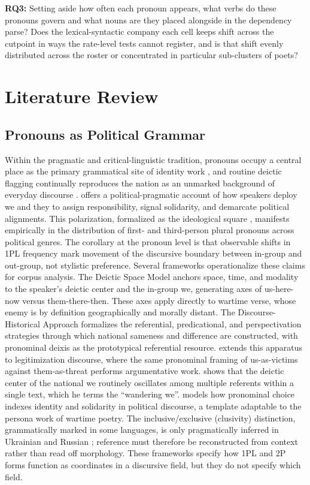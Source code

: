 \documentclass[12pt]{interact}
\theoremstyle{plain}%
\theoremstyle{definition}
\theoremstyle{remark}
\begin{document}
\textbf{RQ3:} Setting aside how often each pronoun appears, what verbs do these pronouns govern and what nouns are they placed alongside in the dependency parse? Does the lexical-syntactic company each cell keeps shift across the cutpoint in ways the rate-level tests cannot register, and is that shift evenly distributed across the roster or concentrated in particular sub-clusters of poets?

\section{Literature Review}

\subsection{Pronouns as Political Grammar}
Within the pragmatic and critical-linguistic tradition, pronouns occupy a central place as the primary grammatical site of identity work \citep{muhlhausler1990pronouns}, and routine deictic flagging continually reproduces the nation as an unmarked background of everyday discourse \citep{billig1995banal}. \citet{wilson1990politically} offers a political-pragmatic account of how speakers deploy we and they to assign responsibility, signal solidarity, and demarcate political alignments. This polarization, formalized as the ideological square \citep{vanDijk2011}, manifests empirically in the distribution of first- and third-person plural pronouns across political genres. The corollary at the pronoun level is that observable shifts in 1PL frequency mark movement of the discursive boundary between in-group and out-group, not stylistic preference.
Several frameworks operationalize these claims for corpus analysis. The Deictic Space Model \citep{chilton2004analysing} anchors space, time, and modality to the speaker's deictic center and the in-group we, generating axes of us-here-now versus them-there-then. These axes apply directly to wartime verse, whose enemy is by definition geographically and morally distant. The Discourse-Historical Approach \citep{wodak2009the} formalizes the referential, predicational, and perspectivation strategies through which national sameness and difference are constructed, with pronominal deixis as the prototypical referential resource. \citet{reyes2011strategies} extends this apparatus to legitimization discourse, where the same pronominal framing of us-as-victims against them-as-threat performs argumentative work. \citet{petersoo2007what} shows that the deictic center of the national we routinely oscillates among multiple referents within a single text, which he terms the ``wandering we''. \citet{fina1995pronominal} models how pronominal choice indexes identity and solidarity in political discourse, a template adaptable to the persona work of wartime poetry. The inclusive/exclusive (clusivity) distinction, grammatically marked in some languages, is only pragmatically inferred in Ukrainian and Russian \citep{cysouw2003the, filimonova2005clusivity, helmbrecht2002grammar}; reference must therefore be reconstructed from context rather than read off morphology. These frameworks specify how 1PL and 2P forms function as coordinates in a discursive field, but they do not specify which field.
\end{document}
